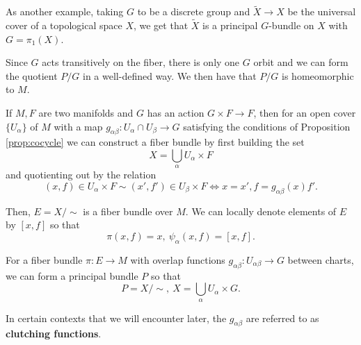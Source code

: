 		\begin{eg}
			As another example, taking $G$ to be a discrete group and $\tilde X \to X$ be the universal cover of a topological space $X$, we get that $\tilde X$ is a principal $G$-bundle on $X$ with $G=\pi_1(X)$.
		\end{eg}
		
		Since $G$ acts transitively on the fiber, there is only one $G$ orbit and we can form the quotient $P/G$ in a well-defined way. We then have that $P/G$ is homeomorphic to $M$.
		
		If $M,F$ are two manifolds and $G$ has an action $G \times F \rightarrow F$, then for an open cover $\{ U_\alpha \}$ of $M$ with a map $g_{\alpha \beta}: U_{\alpha}\cap U_{\beta} \to G$ satisfying the conditions of Proposition \ref{prop:cocycle} we can construct a fiber bundle by first building the set
		\[
			X = \bigcup_\alpha U_\alpha \times F
		\]
		and quotienting out by the relation
		\[
			(x, f) \in U_\alpha \times F \sim (x', f') \in U_\beta \times F \Longleftrightarrow x=x', f=g_{\alpha \beta}(x) f' .
		\]
		
		Then, $E = X/\sim$ is a fiber bundle over $M$. We can locally denote elements of $E$ by $[x,f]$ so that
		\[
			\pi(x,f) = x, ~ \psi_\alpha(x,f) = [x,f].
		\]
		
		\begin{prop}
			For a fiber bundle $\pi: E \rightarrow M$ with overlap functions $g_{\alpha \beta}: U_{\alpha \beta} \rightarrow G$ between charts, we can form a principal bundle $P$ so that 
			\[
				P = X/\sim, ~ X = \bigcup_\alpha U_\alpha \times G.
			\]
		\end{prop}
		In certain contexts that we will encounter later, the $g_{\alpha \beta}$ are referred to as \textbf{clutching functions}.		%
		

